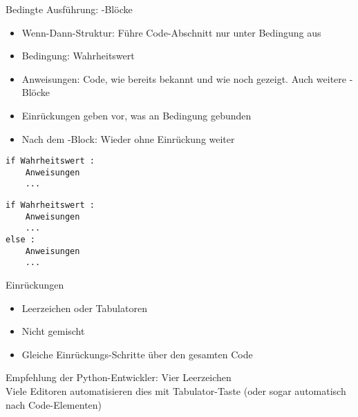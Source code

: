 \begin{frame}[fragile]{Bedingte Ausführung: -Blöcke}
%
\begin{minipage}[t]{.49\linewidth}
\begin{itemize}
\item Wenn-Dann-Struktur: Führe Code-Abschnitt nur unter Bedingung aus
\item Bedingung: Wahrheitswert
\item Anweisungen: Code, wie bereits bekannt und wie noch gezeigt. Auch weitere -Blöcke
\item Einrückungen geben vor, was an Bedingung gebunden
\item Nach dem -Block: Wieder ohne Einrückung weiter
\end{itemize}
\end{minipage}
%
\begin{minipage}[t]{.49\linewidth}
\phantom{x}
\begin{codebox}
\begin{verbatim}
if Wahrheitswert :
    Anweisungen
    ...
\end{verbatim}
\end{codebox}
%
\begin{codebox}
\begin{verbatim}
if Wahrheitswert :
    Anweisungen
    ...
else :
    Anweisungen
    ...
\end{verbatim}
\end{codebox}
\end{minipage}
%
\end{frame}


\begin{frame}{Einrückungen}
%
\begin{itemize}
\item Leerzeichen oder Tabulatoren
\item Nicht gemischt
\item Gleiche Einrückungs-Schritte über den gesamten Code
\end{itemize}
%
\begin{hintbox}
Empfehlung der Python-Entwickler: Vier Leerzeichen\\
Viele Editoren automatisieren dies mit Tabulator-Taste (oder sogar automatisch nach Code-Elementen)
\end{hintbox}
%
\end{frame}

